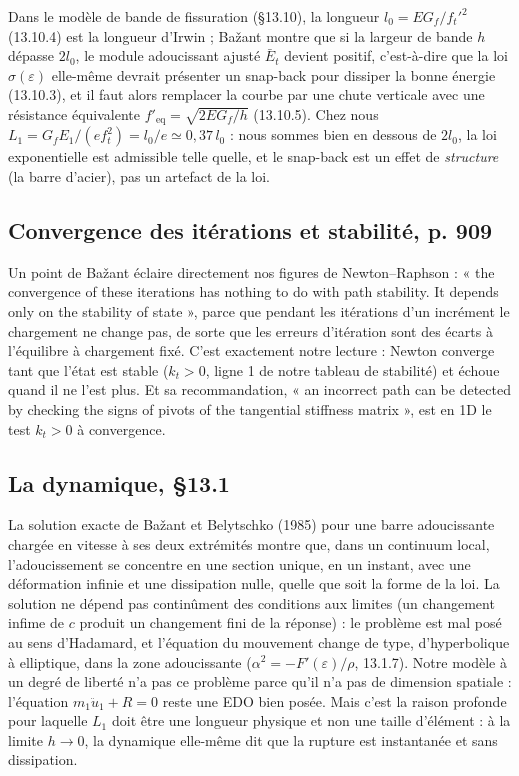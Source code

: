 \documentclass[11pt,a4paper]{article}
\begin{document}
Dans le modèle de bande de fissuration (§13.10), la longueur $l_0 = EG_f/f_t'^2$ (13.10.4) est
la longueur d'Irwin ; Bažant montre que si la largeur de bande $h$ dépasse $2l_0$, le module
adoucissant ajusté $\bar E_t$ devient positif, c'est-à-dire que la loi $\sigma(\varepsilon)$
elle-même devrait présenter un snap-back pour dissiper la bonne énergie (13.10.3), et il faut
alors remplacer la courbe par une chute verticale avec une résistance équivalente
$f'_{\text{eq}} = \sqrt{2EG_f/h}$ (13.10.5). Chez nous $L_1 = G_fE_1/(ef_t^2) = l_0/e \simeq 0{,}37\,l_0$ :
nous sommes bien en dessous de $2l_0$, la loi exponentielle est admissible telle quelle, et le
snap-back est un effet de \emph{structure} (la barre d'acier), pas un artefact de la loi.

\subsection{Convergence des itérations et stabilité, p. 909}
Un point de Bažant éclaire directement nos figures de Newton--Raphson : « the convergence of
these iterations has nothing to do with path stability. It depends only on the stability of
state », parce que pendant les itérations d'un incrément le chargement ne change pas, de
sorte que les erreurs d'itération sont des écarts à l'équilibre à chargement fixé. C'est
exactement notre lecture : Newton converge tant que l'état est stable ($k_t > 0$, ligne 1 de
notre tableau de stabilité) et échoue quand il ne l'est plus. Et sa recommandation, « an
incorrect path can be detected by checking the signs of pivots of the tangential stiffness
matrix », est en 1D le test $k_t > 0$ à convergence.

\subsection{La dynamique, §13.1}
La solution exacte de Bažant et Belytschko (1985) pour une barre adoucissante chargée en
vitesse à ses deux extrémités montre que, dans un continuum local, l'adoucissement se
concentre en une section unique, en un instant, avec une déformation infinie et une
dissipation nulle, quelle que soit la forme de la loi. La solution ne dépend pas continûment
des conditions aux limites (un changement infime de $c$ produit un changement fini de la
réponse) : le problème est mal posé au sens d'Hadamard, et l'équation du mouvement change de
type, d'hyperbolique à elliptique, dans la zone adoucissante ($\alpha^2 = -F'(\varepsilon)/\rho$, 13.1.7).
Notre modèle à un degré de liberté n'a pas ce problème parce qu'il n'a pas de dimension
spatiale : l'équation $m_1\ddot u_1 + R = 0$ reste une EDO bien posée. Mais c'est la raison
profonde pour laquelle $L_1$ doit être une longueur physique et non une taille d'élément : à
la limite $h \to 0$, la dynamique elle-même dit que la rupture est instantanée et sans
dissipation.
\end{document}
